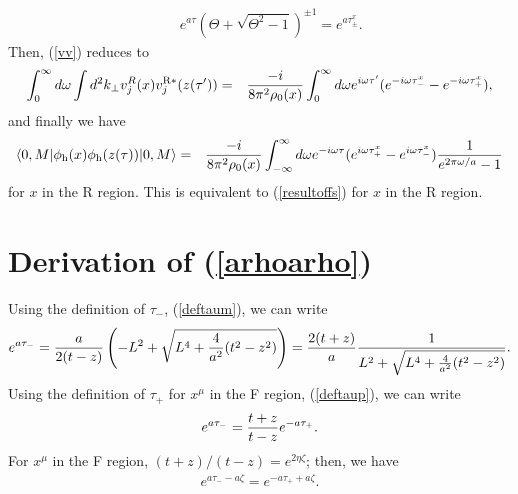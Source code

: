 \documentclass[aps,prd,preprintnumbers,nofootinbib,showpacs,11pt]{revtex4}%
\begin{document}
\begin{widetext}
\begin{eqnarray}
\\
&&e^{a\tau}(\Theta+\sqrt{\Theta^2-1})^{\pm1} =e^{a\tau_\pm^x}.
\end{eqnarray}
Then, (\ref{vv}) reduces to
\begin{eqnarray}
\int_0^\infty d\omega \int d^2k_\perp v_j^R(x)v_j^{\rm R*}(z(\tau'))
&=&{ -i\over 8\pi^2\rho_0(x)} 
\int_0^\infty d\omega e^{i\omega\tau'} (e^{-i\omega\tau_-^x}-e^{-i\omega\tau_+^x}),
\end{eqnarray}
and finally we have 
\begin{eqnarray}
\langle0,M|\phi_{\rm h}(x)\phi_{\rm h}(z(\tau))|0,M\rangle
&=&{ -i\over 8\pi^2\rho_0(x)} 
\int_{-\infty}^{\infty} d\omega e^{-i\omega\tau} (e^{i\omega\tau_+^x}-e^{i\omega\tau_-^x}){1\over e^{2\pi\omega/a}-1}
\end{eqnarray}
for $x$ in the R region. This is equivalent to (\ref{resultoffs}) for $x$ in the R region. 


\section{Derivation of (\ref{arhoarho})}
Using the definition of $\tau_-$, (\ref{deftaum}), we can write
\begin{eqnarray}
e^{a\tau_-}={a\over 2(t-z)}\left(-L^2+\sqrt{L^4+{4\over a^2}(t^2-z^2)}\right)
={2(t+z)\over a}{1\over L^2+\sqrt{L^4+{4\over a^2}(t^2-z^2)}}.
\end{eqnarray}
Using the definition of $\tau_+$ for $x^\mu$ in the F region, 
(\ref{deftaup}), we can write
\begin{eqnarray}
e^{a\tau_-}={t+z\over t-z}e^{-a\tau_+}.
\end{eqnarray}
For $x^\mu$ in the F region, $(t+z)/(t-z)=e^{2\eta\zeta}$; then, we have
\begin{eqnarray}
e^{a\tau_--a\zeta}=e^{-a\tau_++a\zeta}.
\end{eqnarray}


\end{widetext}
\end{document}
